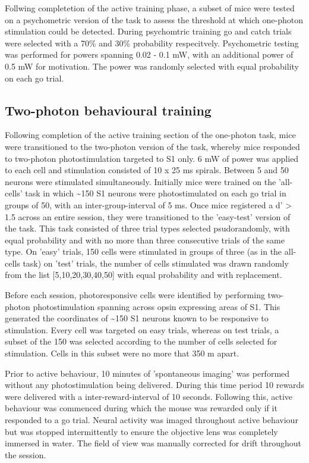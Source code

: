 Follwing completetion of the active training phase, a subset of mice were tested on a psychometric version of the task to assess the threshold at which one-photon stimulation could be detected. During psychomtric training go and catch trials were selected with a 70\% and 30\% probability respecitvely. Psychometric testing was performed for powers spanning 0.02 - 0.1 mW, with an additional power of 0.5 mW for motivation. The power was randomly selected with equal probability on each go trial. 

\subsection{Two-photon behavioural training}

Following completion of the active training section of the one-photon task, mice were transitioned to the two-photon version of the task, whereby mice responded to two-photon photostimulation targeted to S1 only. 6 mW of power was applied to each cell and stimulation consisted of 10 x 25 ms spirals. Between 5 and 50 neurons were stimulated simultaneously. Initially mice were trained on the 'all-cells' task in which \textasciitilde150 S1 neurons were photostimulated on each go trial in groups of 50, with an inter-group-interval of 5 ms. Once mice registered a d' > 1.5 across an entire session, they were transitioned to the 'easy-test' version of the task. This task consisted of three trial types selected psudorandomly, with equal probability and with no more than three consecutive trials of the same type. On 'easy' trials, 150 cells were stimulated in groups of three (as in the all-cells task) on 'test' trials, the number of cells stimulated was drawn randomly from the list [5,10,20,30,40,50] with equal probability and with replacement. 

Before each session, photoresponsive cells were identified by performing two-photon photostimulation spanning across opsin expressing areas of S1. This generated the coordinates of \textasciitilde150 S1 neurons known to be responsive to stimulation. Every cell was targeted on easy trials, whereas on test trials, a subset of the 150 was selected according to the number of cells selected for stimulation. Cells in this subset were no more that 350 \textmu m apart. 

Prior to active behaviour, 10 minutes of 'spontaneous imaging' was performed without any photostimulation being delivered. During this time period 10 rewards were delivered with a inter-reward-interval of 10 seconds. Following this, active behaviour was commenced during which the mouse was rewarded only if it responded to a go trial. Neural activity was imaged throughout active behaviour but was stopped intermittently to ensure the objective lens was completely immersed in water. The field of view was manually corrected for drift throughout the session.

